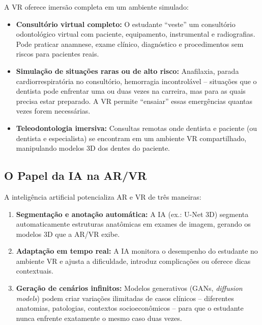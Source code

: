 A VR oferece imersão completa em um ambiente simulado:

\begin{itemize}
  \item \textbf{Consultório virtual completo:} O estudante ``veste'' um
    consultório odontológico virtual com paciente, equipamento, instrumental e
    radiografias. Pode praticar anamnese, exame clínico, diagnóstico e
    procedimentos sem riscos para pacientes reais.

  \item \textbf{Simulação de situações raras ou de alto risco:} Anafilaxia,
    parada cardiorrespiratória no consultório, hemorragia incontrolável --
    situações que o dentista pode enfrentar uma ou duas vezes na carreira, mas
    para as quais precisa estar preparado. A VR permite ``ensaiar'' essas
    emergências quantas vezes forem necessárias.

  \item \textbf{Teleodontologia imersiva:} Consultas remotas onde dentista e
    paciente (ou dentista e especialista) se encontram em um ambiente VR
    compartilhado, manipulando modelos 3D dos dentes do paciente.
\end{itemize}

\subsection{O Papel da IA na AR/VR}

A inteligência artificial potencializa AR e VR de três maneiras:

\begin{enumerate}
  \item \textbf{Segmentação e anotação automática:} A IA (ex.: U-Net 3D)
    segmenta automaticamente estruturas anatômicas em exames de imagem,
    gerando os modelos 3D que a AR/VR exibe.

  \item \textbf{Adaptação em tempo real:} A IA monitora o desempenho do
    estudante no ambiente VR e ajusta a dificuldade, introduz complicações
    ou oferece dicas contextuais.

  \item \textbf{Geração de cenários infinitos:} Modelos generativos (GANs,
    \textit{diffusion models}) podem criar variações ilimitadas de casos
    clínicos -- diferentes anatomias, patologias, contextos socioeconômicos --
    para que o estudante nunca enfrente exatamente o mesmo caso duas vezes.
\end{enumerate}

